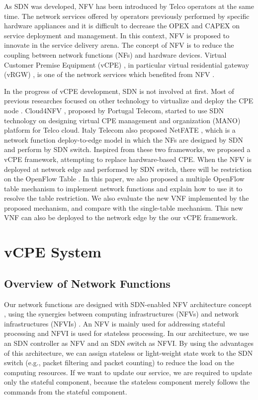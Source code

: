 \documentclass[conference]{IEEEtran}
\begin{document}
As SDN was developed, NFV \cite{nfv-wp, etsi-nfv-archi, nfv-survey} has been introduced by Telco operators at the same time.
The network services offered by operators previously performed by specific hardware appliances and it is difficult to decrease the OPEX and CAPEX on service deployment and management.
In this context, NFV is proposed to innovate in the service delivery arena.
The concept of NFV is to reduce the coupling between network functions (NFs) and hardware devices.
Virtual Customer Premise Equipment (vCPE) \cite{nec-vcpe, vcpe-enhance}, in particular virtual residential gateway (vRGW) \cite{nfv-home}, is one of the network services which benefited from NFV \cite{etsi-nfv-usecase}.

In the progress of vCPE development, SDN is not involved at first.
Most of previous researches focused on other technology to virtualize and deploy the CPE node \cite{virtual-rg, security-vgw, design-vrgw, nfv-hgw-surrogate, linux-cpe, nfv-resoure-contrain-cpe}.
Cloud4NFV \cite{cloud4nfv, cloud4nfv-telco}, proposed by Portugal Telecom, started to use SDN technology on designing virtual CPE management and organization (MANO) platform for Telco cloud.
Italy Telecom also proposed NetFATE \cite{netfate}, which is a network function deploy-to-edge model in which the NFs are designed by SDN and perform by SDN switch. Inspired from these two frameworks, we proposed a vCPE framework, attempting to replace hardware-based CPE.
When the NFV is deployed at network edge and performed by SDN switch, there will be restriction on the OpenFlow Table \cite{multiple-flow-table}.
In this paper, we also proposed a multiple OpenFlow table mechanism to implement network functions and explain how to use it to resolve the table restriction.
We also evaluate the new VNF implemented by the proposed mechanism, and compare with the single-table mechanism.
This new VNF can also be deployed to the network edge by the our vCPE framework.





\section{vCPE System}
\subsection{Overview of Network Functions} \label{ssec:desc_nfv_overview}
Our network functions are designed with SDN-enabled NFV architecture concept \cite{sdn-enabled}, using the synergies between computing infrastructures (NFVs) and network infrastructures (NFVIs) \cite{etsi-nfv-terminology, etsi-nfv-infra}.
An NFV is mainly used for addressing stateful processing and NFVI is used for stateless processing. In our architecture, we use an SDN controller as NFV and an SDN switch as NFVI.
By using the advantages of this architecture, we can assign stateless or light-weight state work to the SDN switch (e.g., packet filtering and packet counting) to reduce the load on the computing resources. If we want to update our service, we are required to update only the stateful component, because the stateless component merely follows the commands from the stateful component.
\end{document}

